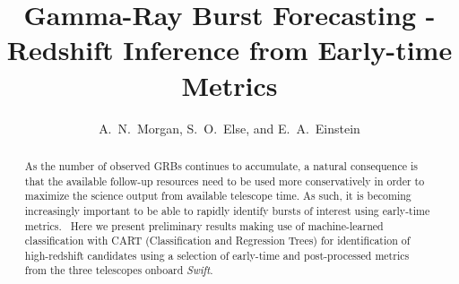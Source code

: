 \documentclass[12pt,preprint]{aastex}
\newcommand{\Swift}{\textit{Swift}}
\begin{document}
\title{Gamma-Ray Burst Forecasting - Redshift Inference from Early-time Metrics}

\author{A.~N.~Morgan, S.~O.~Else,
  and E.~A.~Einstein}




\begin{abstract}

As the number of observed GRBs continues to accumulate, a natural consequence 
is that the available follow-up resources need to be used more conservatively 
in order to maximize the science output from available telescope time. As 
such, it is becoming increasingly important to be able to rapidly identify 
bursts of interest using early-time metrics.  Here we present preliminary 
results making use of machine-learned classification with CART (Classification
and Regression Trees) for identification of high-redshift candidates using a 
selection of early-time and post-processed metrics from the three telescopes 
onboard \Swift.
\end{abstract}
\end{document}
